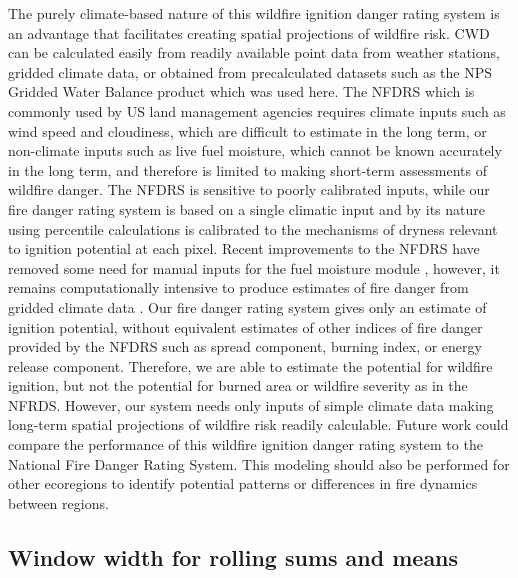 \documentclass[11p]{article}
\begin{document}
The purely climate-based nature of this wildfire ignition danger rating system is an advantage that facilitates creating spatial projections of wildfire risk. CWD can be calculated easily from readily available point data from weather stations, gridded climate data, or obtained from precalculated datasets such as the NPS Gridded Water Balance product \citep{tercekHistoricalChangesPlant2021} which was used here. The NFDRS \citep{degrootChapter11Wildland2015} which is commonly used by US land management agencies requires climate inputs such as wind speed and cloudiness, which are difficult to estimate in the long term, or non-climate inputs such as live fuel moisture, which cannot be known accurately in the long term, and therefore is limited to making short-term assessments of wildfire danger. The NFDRS is sensitive to poorly calibrated inputs, while our fire danger rating system is based on a single climatic input and by its nature using percentile calculations is calibrated to the mechanisms of dryness relevant to ignition potential at each pixel. Recent improvements to the NFDRS have removed some need for manual inputs for the fuel moisture module \citep{jollyModernizingUSNational2024}, however, it remains computationally intensive to produce estimates of fire danger from gridded climate data \citep{farguellFastSpatialNFDRS2025a}. %
Our fire danger rating system gives only an estimate of ignition potential, without equivalent estimates of other indices of fire danger provided by the NFDRS such as spread component, burning index, or energy release component. Therefore, we are able to estimate the potential for wildfire ignition, but not the potential for burned area or wildfire severity as in the NFRDS. However, our system needs only inputs of simple climate data making long-term spatial projections of wildfire risk readily calculable. Future work could compare the performance of this wildfire ignition danger rating system to the National Fire Danger Rating System. This modeling should also be performed for other ecoregions to identify potential patterns or differences in fire dynamics between regions. 


\subsection{Window width for rolling sums and means}
\end{document}
